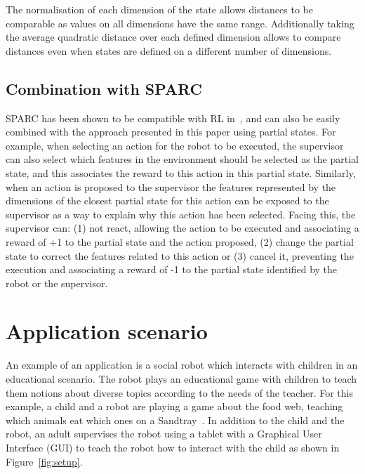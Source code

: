 \documentclass[letterpaper]{article} %
\begin{document}
The normalisation of each dimension of the state allows distances to be
comparable as values on all dimensions have the same range. Additionally taking
the average quadratic distance over each defined dimension allows to compare
distances even when states are defined on a different number of dimensions.


\subsection{Combination with SPARC}

SPARC has been shown to be compatible with RL in~\cite{senft2017supervised}, and
can also be easily combined with the approach presented in this paper using
partial states. For example, when selecting an action for the robot to be
executed, the supervisor can also select which features in the environment
should be selected as the partial state, and this associates the reward to this
action in this partial state. Similarly, when an action is proposed to the
supervisor the features represented by the dimensions of the closest partial
state for this action can be exposed to the supervisor as a way to explain why
this action has been selected. Facing this, the supervisor can: (1) not react,
allowing the action to be executed and associating a reward of +1 to the partial
state and the action proposed, (2) change the partial state to correct the
features related to this action or (3) cancel it, preventing the execution and
associating a reward of -1 to the partial state identified by the robot or the
supervisor. 

\section{Application scenario}


An example of an application is a social robot which interacts with children in
an educational scenario.  The robot plays an educational game with children to
teach them notions about diverse topics according to the needs of the teacher.
For this example, a child and a robot are playing a game about the food web,
teaching which animals eat which ones on a Sandtray~\cite{baxter2012touchscreen}.
In addition to the child and the robot, an adult supervises the robot using a
tablet with a Graphical User Interface (GUI) to teach the robot how to interact
with the child as shown in Figure~\ref{fig:setup}.
\end{document}

